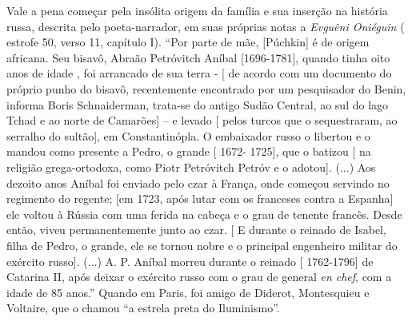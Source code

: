 Vale a pena começar pela insólita origem da família e sua inserção na
história russa, descrita pelo poeta-narrador, em suas próprias notas a
\emph{Evguêni Oniéguin} ( estrofe 50, verso 11, capítulo I). ``Por parte
de mãe, {[}Púchkin{]} é de origem africana. Seu bisavô, Abraão
Petróvitch Aníbal {[}1696-1781{]}, quando tinha oito anos de idade , foi
arrancado de sua terra - {[} de acordo com um documento do próprio punho
do bisavô, recentemente encontrado por um pesquisador do Benin, informa
Boris Schnaiderman, trata-se do antigo Sudão Central, ao sul do lago
Tchad e ao norte de Camarões{]} -- e levado {[} pelos turcos que o
sequestraram, ao serralho do sultão{]}, em Constantinópla. O embaixador
russo o libertou e o mandou como presente a Pedro, o grande {[} 1672-
1725{]}, que o batizou {[} na religião grega-ortodoxa, como Piotr
Petróvitch Petróv e o adotou{]}. (...) Aos dezoito anos Aníbal foi
enviado pelo czar à França, onde começou servindo no regimento do
regente; {[}em 1723, após lutar com os franceses contra a Espanha{]} ele
voltou à Rússia com uma ferida na cabeça e o grau de tenente francês.
Desde então, viveu permanentemente junto ao czar. {[} E durante o
reinado de Isabel, filha de Pedro, o grande, ele se tornou nobre e o
principal engenheiro militar do exército russo{]}. (...) A. P. Aníbal
morreu durante o reinado {[} 1762-1796{]} de Catarina II, após deixar o
exército russo com o grau de general \emph{en chef}, com a idade de 85
anos.'' Quando em Paris, foi amigo de Diderot, Montesquieu e Voltaire,
que o chamou ``a estrela preta do Iluminismo''.

